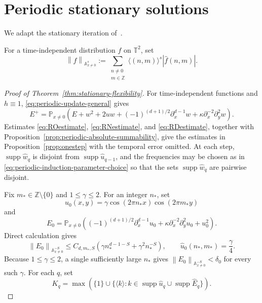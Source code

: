 \documentclass[12pt,reqno,letterpaper]{amsart}
\numberwithin{equation}{section}
\theoremstyle{definition}
\newcommand{\T}{\mathbb T}
\newcommand{\Z}{\mathbb Z}
\newcommand{\A}{\mathbb A}
\newcommand{\supp}{\operatorname{supp}}
\newcommand{\norm}[1]{\left\lVert #1\right\rVert}
\newcommand{\abs}[1]{\left\lvert #1\right\rvert}
\begin{document}
\appendix

\section{Periodic stationary solutions}


We adapt the stationary iteration of~\cite{Pathak}.

For a time-independent distribution $f$ on $\T^2$, set
\[
 \norm f_{\A^s_{x\neq0}}
 :=\sum_{\substack{n\neq0\\m\in\Z}}
   \langle(n,m)\rangle^s\abs{\widehat f(n,m)}.
\]
\begin{proof}[Proof of Theorem~\ref{thm:stationary-flexibility}]
For time-independent functions and $h\equiv1$,
\eqref{eq:periodic-update-general} gives
\begin{equation}\label{eq:stationary-error-update}
 E^+=\mathbb P_{x\neq0}\left(
 E+w^2+2uw+(-1)^{(d+1)/2}\partial_x^{d-1}w
   +\kappa\partial_x^{-2}\partial_y^2w\right).
\end{equation}
Estimates \eqref{eq:ROestimate}, \eqref{eq:RNestimate}, and
\eqref{eq:RDestimate}, together with
Proposition~\ref{prop:periodic-absolute-summability}, give the estimates in
Proposition~\ref{prop:onestep} with the temporal error omitted.  At each
step, $\supp\widehat w_q$ is disjoint from
$\supp\widehat u_{q-1}$, and the frequencies may be chosen as in
\eqref{eq:periodic-induction-parameter-choice} so that the sets
$\supp\widehat w_q$ are pairwise disjoint.

Fix $m_*\in\Z\setminus\{0\}$ and $1\leq\gamma\leq2$.  For an integer
$n_*$, set
\[
 u_0(x,y)=\gamma\cos(2\pi n_*x)\cos(2\pi m_*y)
\]
and
\[
 E_0=\mathbb P_{x\neq0}\left(
   (-1)^{(d+1)/2}\partial_x^{d-1}u_0
   +\kappa\partial_x^{-2}\partial_y^2u_0+u_0^2
 \right).
\]
Direct calculation gives
\[
 \norm{E_0}_{\A^{-S}_{x\neq0}}
 \leq C_{d,m_*,S}\left(
    \gamma n_*^{d-1-S}+\gamma^2n_*^{-S}\right),
 \qquad
 \widehat u_0(n_*,m_*)=\frac\gamma4.
\]
Because $1\leq\gamma\leq2$, a single sufficiently large $n_*$ gives
$\norm{E_0}_{\A^{-S}_{x\neq0}}<\delta_0$ for every such $\gamma$.
For each $q$, set
\[
 K_q=\max\left(\{1\}\cup
 \{\langle k\rangle:k\in\supp\widehat u_q
       \cup\supp\widehat E_q\}\right).
\]


\end{proof}
\end{document}
